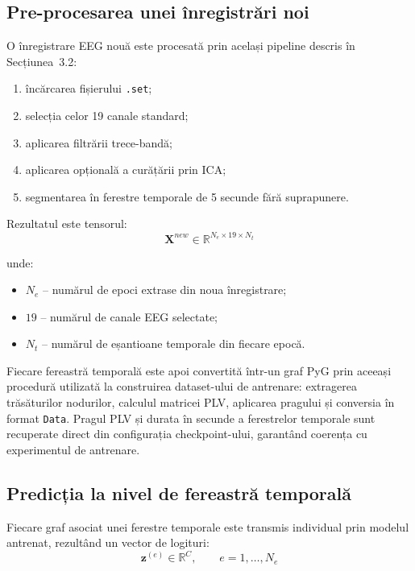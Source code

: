 \documentclass[12pt,a4paper]{report}
\theoremstyle{definition}
\theoremstyle{remark}
\begin{document}
\subsection{Pre-procesarea unei înregistrări noi}

O înregistrare EEG nouă este procesată prin același pipeline descris în Secțiunea~3.2:
\begin{enumerate}
    \item încărcarea fișierului \texttt{.set};
    \item selecția celor 19 canale standard;
    \item aplicarea filtrării trece-bandă;
    \item aplicarea opțională a curățării prin ICA;
    \item segmentarea în ferestre temporale de 5 secunde fără suprapunere.
\end{enumerate}

Rezultatul este tensorul:
\begin{equation}
    \mathbf{X}^{new} \in \mathbb{R}^{N_e \times 19 \times N_t}
    \label{eq:new_recording_epochs}
\end{equation}

\noindent unde:
\begin{itemize}
    \item $N_e$ -- numărul de epoci extrase din noua înregistrare;
    \item $19$ -- numărul de canale EEG selectate;
    \item $N_t$ -- numărul de eșantioane temporale din fiecare epocă.
\end{itemize}

Fiecare fereastră temporală este apoi convertită într-un graf PyG prin aceeași procedură utilizată la construirea dataset-ului de antrenare: extragerea trăsăturilor nodurilor, calculul matricei PLV, aplicarea pragului și conversia în format \texttt{Data}. Pragul PLV și durata în secunde a ferestrelor temporale sunt recuperate direct din configurația checkpoint-ului, garantând coerența cu experimentul de antrenare.

\subsection{Predicția la nivel de fereastră temporală}

Fiecare graf asociat unei ferestre temporale este transmis individual prin modelul antrenat, rezultând un vector de logituri:
\begin{equation}
    \mathbf{z}^{(e)} \in \mathbb{R}^{C}, \qquad e = 1, \ldots, N_e
    \label{eq:epoch_logits}
\end{equation}
\end{document}
